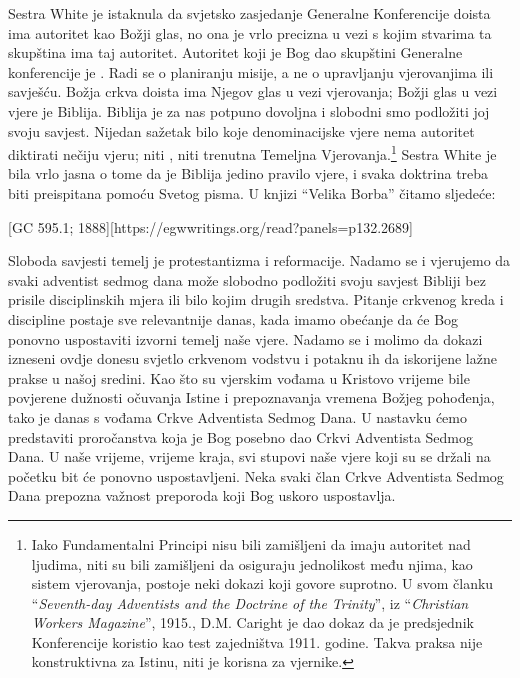 Sestra White je istaknula da svjetsko zasjedanje Generalne Konferencije doista ima autoritet kao Božji glas, no ona je vrlo precizna u vezi s kojim stvarima ta skupština ima taj autoritet. Autoritet koji je Bog dao skupštini Generalne konferencije je . Radi se o planiranju misije, a ne o upravljanju vjerovanjima ili savješću. Božja crkva doista ima Njegov glas u vezi vjerovanja; Božji glas u vezi vjere je Biblija. Biblija je za nas potpuno dovoljna i slobodni smo podložiti joj svoju savjest. Nijedan sažetak bilo koje denominacijske vjere nema autoritet diktirati nečiju vjeru; niti , niti trenutna Temeljna Vjerovanja.\footnote{Iako Fundamentalni Principi nisu bili zamišljeni da imaju autoritet nad ljudima, niti su bili zamišljeni da osiguraju jednolikost među njima, kao sistem vjerovanja, postoje neki dokazi koji govore suprotno. U svom članku “\textit{Seventh-day Adventists and the Doctrine of the Trinity}”, iz “\textit{Christian Workers Magazine}”, 1915., D.M. Caright je dao dokaz da je predsjednik Konferencije koristio  kao test zajedništva 1911. godine. Takva praksa nije konstruktivna za Istinu, niti je korisna za vjernike.} Sestra White je bila vrlo jasna o tome da je Biblija jedino pravilo vjere, i svaka doktrina treba biti preispitana pomoću Svetog pisma. U knjizi “Velika Borba” čitamo sljedeće:

[GC 595.1; 1888][https://egwwritings.org/read?panels=p132.2689]

Sloboda savjesti temelj je protestantizma i reformacije. Nadamo se i vjerujemo da svaki adventist sedmog dana može slobodno podložiti svoju savjest Bibliji bez prisile disciplinskih mjera ili bilo kojim drugih sredstva. Pitanje crkvenog kreda i discipline postaje sve relevantnije danas, kada imamo obećanje da će Bog ponovno uspostaviti izvorni temelj naše vjere. Nadamo se i molimo da dokazi izneseni ovdje donesu svjetlo crkvenom vodstvu i potaknu ih da iskorijene lažne prakse u našoj sredini. Kao što su vjerskim vođama u Kristovo vrijeme bile povjerene dužnosti očuvanja Istine i prepoznavanja vremena Božjeg pohođenja, tako je danas s vođama Crkve Adventista Sedmog Dana. U nastavku ćemo predstaviti proročanstva koja je Bog posebno dao Crkvi Adventista Sedmog Dana. U naše vrijeme, vrijeme kraja, svi stupovi naše vjere koji su se držali na početku bit će ponovno uspostavljeni. Neka svaki član Crkve Adventista Sedmog Dana prepozna važnost preporoda koji Bog uskoro uspostavlja.

